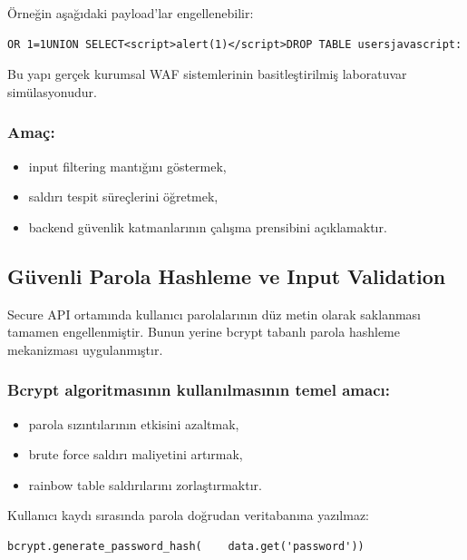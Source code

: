 Örneğin aşağıdaki payload’lar engellenebilir:

\begin{lstlisting}
OR 1=1UNION SELECT<script>alert(1)</script>DROP TABLE usersjavascript:
\end{lstlisting}

Bu yapı gerçek kurumsal WAF sistemlerinin basitleştirilmiş laboratuvar simülasyonudur.

\subsubsection{Amaç:}

\begin{itemize}[leftmargin=*]
    \item input filtering mantığını göstermek,
    \item saldırı tespit süreçlerini öğretmek,
    \item backend güvenlik katmanlarının çalışma prensibini açıklamaktır.
\end{itemize}

\subsection{Güvenli Parola Hashleme ve Input Validation}
\label{g-venli-parola-hashleme-ve-input-validat}

Secure API ortamında kullanıcı parolalarının düz metin olarak saklanması tamamen engellenmiştir. Bunun yerine bcrypt tabanlı parola hashleme mekanizması uygulanmıştır.

\subsubsection{Bcrypt algoritmasının kullanılmasının temel amacı:}

\begin{itemize}[leftmargin=*]
    \item parola sızıntılarının etkisini azaltmak,
    \item brute force saldırı maliyetini artırmak,
    \item rainbow table saldırılarını zorlaştırmaktır.
\end{itemize}

Kullanıcı kaydı sırasında parola doğrudan veritabanına yazılmaz:

\begin{lstlisting}
bcrypt.generate_password_hash(    data.get('password'))
\end{lstlisting}

